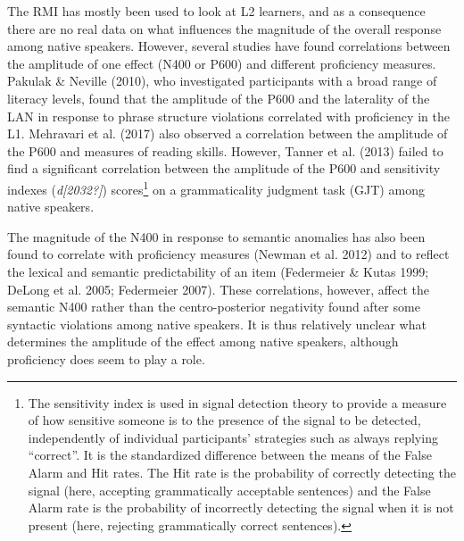 \documentclass[11pt]{article}
\newenvironment{styleStandard}{\renewcommand\baselinestretch{1.0}\setlength\leftskip{0cm}\setlength\rightskip{0cm plus 1fil}\setlength\parindent{0cm}\setlength\parfillskip{0pt plus 1fil}\setlength\parskip{0in plus 1pt}\writerlistparindent\writerlistleftskip\leavevmode\normalfont\normalsize\writerlistlabel\ignorespaces}{\unskip\vspace{0.111in plus 0.0111in}\par}
\newcommand\writerlistleftskip{}
\newcommand\writerlistparindent{}
\newcommand\writerlistlabel{}
\begin{document}
\begin{styleStandard}
The RMI has mostly been used to look at L2 learners, and as a consequence there are no real data on what influences the magnitude of the overall response among native speakers. However, several studies have found correlations between the amplitude of one effect (N400 or P600) and different proficiency measures. Pakulak \& Neville (2010), who investigated participants with a broad range of literacy levels, found that the amplitude of the P600 and the laterality of the LAN in response to phrase structure violations correlated with proficiency in the L1. Mehravari et al. (2017) also observed a correlation between the amplitude of the P600 and measures of reading skills. However, Tanner et al. (2013) failed to find a significant correlation between the amplitude of the P600 and sensitivity indexes (\textit{d[2032?]})\textit{ }scores\footnote{\textrm{ The sensitivity index is used in signal detection theory to provide a measure of how sensitive someone is to the presence of the signal to be detected, independently of individual participants’ strategies such as always replying “correct”. It is the standardized difference between the means of the False Alarm and Hit rates. The Hit rate is the probability of correctly detecting the signal (here, accepting grammatically acceptable sentences) and the False Alarm rate is the probability of incorrectly detecting the signal when it is not present (here, rejecting grammatically correct sentences). }} on a grammaticality judgment task (GJT) among native speakers. 
\end{styleStandard}

\begin{styleStandard}
The magnitude of the N400 in response to semantic anomalies has also been found to correlate with proficiency measures (Newman et al. 2012) and to reflect the lexical and semantic predictability of an item (Federmeier \& Kutas 1999; DeLong et al. 2005; Federmeier 2007). These correlations, however, affect the semantic N400 rather than the centro-posterior negativity found after some syntactic violations among native speakers. It is thus relatively unclear what determines the amplitude of the effect among native speakers, although proficiency does seem to play a role.
\end{styleStandard}
\end{document}

